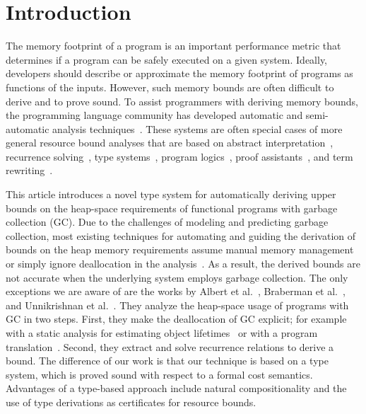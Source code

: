 \documentclass{easychair}
\theoremstyle{definition}
\begin{document}
\section{Introduction}
\label{sect:introduction}
The memory footprint of a program is an important performance metric
that determines if a program can be safely executed on a given
system. Ideally, developers should describe or approximate the memory
footprint of programs as functions of the inputs. However, such memory
bounds are often difficult to derive and to prove sound.
%
To assist programmers with deriving memory bounds, the programming
language community has developed automatic and semi-automatic analysis
techniques~\cite{Jost03,Chin08,Albert07b}.
%
These systems are often special cases of more general resource bound
analyses that are based on abstract
interpretation~\cite{GulwaniMC09,BlancHHK10,SinnZV14},
recurrence
solving~\cite{FloresH14,AlbertFR15,DannerLR15,KincaidBBR2017}, type
systems~\cite{Jost10,HoffmannW15,LagoG11,CicekBGGH16,OOPSLA:WWC17,DasHP18},
program logics~\cite{Atkey10,CarbonneauxHZ15,CarbonneauxHRS17,Radicek17}, proof
assistants~\cite{Nipkow15,ChargueraudP15}, and term
rewriting~\cite{AvanziniM13,NoschinskiEG13,FrohnNHBG16}.

This article introduces a novel type system for automatically deriving
upper bounds on the heap-space requirements of functional programs
with garbage collection (GC).
%
Due to the challenges of modeling and predicting garbage collection,
most existing techniques for automating and guiding the derivation of
bounds on the heap memory requirements assume manual memory management
or simply ignore deallocation in the
analysis~\cite{Jost03,Jost06,SimoesVFJH12,Chin05,Chin08,Albert07b}. As
a result, the derived bounds are not accurate when the underlying
system employs garbage collection. The only exceptions we are aware of
are the works by Albert et al.~\cite{Albert09,Albert13}, Braberman
et al.~\cite{Braberman08}, and Unnikrishnan et
al.~\cite{UnnikrishnanSL03,Unnikrishnan09}. They analyze the
heap-space usage of programs with GC in two steps. First, they make
the deallocation of GC explicit; for example with a static analysis
for estimating object lifetimes~\cite{Albert13} or with a program
translation~\cite{Unnikrishnan09}. Second, they extract and solve
recurrence relations to derive a bound. The difference of our work is
that our technique is based on a type system, which is proved sound
with respect to a formal cost semantics. Advantages of a type-based
approach include natural compositionality and the use of type
derivations as certificates for resource bounds.
\end{document}

